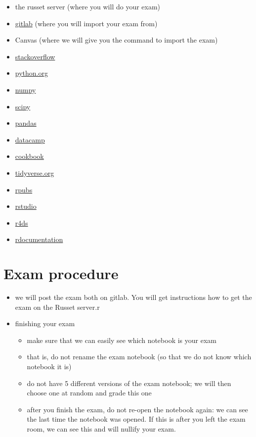 \documentclass[]{book}
\providecommand{\tightlist}{%
  \setlength{\itemsep}{0pt}\setlength{\parskip}{0pt}}
\begin{document}
\begin{itemize}
\tightlist
\item
  the russet server (where you will do your exam)
\item
  \href{gitlab.uvt.nl}{gitlab} (where you will import your exam from)
\item
  Canvas (where we will give you the command to import the exam)
\item
  \href{https://stackoverflow.com/}{stackoverflow}
\item
  \href{https://www.python.org/}{python.org}
\item
  \href{http://www.numpy.org/}{numpy}
\item
  \href{https://www.scipy.org/}{scipy}
\item
  \href{https://pandas.pydata.org/}{pandas}
\item
  \href{https://www.datacamp.com/home}{datacamp}
\item
  \href{http://www.cookbook-r.com/}{cookbook}
\item
  \href{https://dplyr.tidyverse.org/}{tidyverse.org}
\item
  \href{https://rpubs.com/}{rpubs}
\item
  \href{https://www.rstudio.com/}{rstudio}
\item
  \href{https://r4ds.had.co.nz/}{r4ds}
\item
  \href{https://www.rdocumentation.org/}{rdocumentation}
\end{itemize}

\hypertarget{exam-procedure}{%
\section{Exam procedure}\label{exam-procedure}}

\begin{itemize}
\tightlist
\item
  we will post the exam both on gitlab. You will get instructions how to get the exam on the Russet server.r
\item
  finishing your exam

  \begin{itemize}
  \tightlist
  \item
    make sure that we can easily see which notebook is your exam
  \item
    that is, do not rename the exam notebook (so that we do not know which notebook it is)
  \item
    do not have 5 different versions of the exam notebook; we will then choose one at random and grade this one
  \item
    after you finish the exam, do not re-open the notebook again: we can see the last time the notebook was opened. If this is after you left the exam room, we can see this and will nullify your exam.
  \end{itemize}
\end{itemize}


\end{document}
